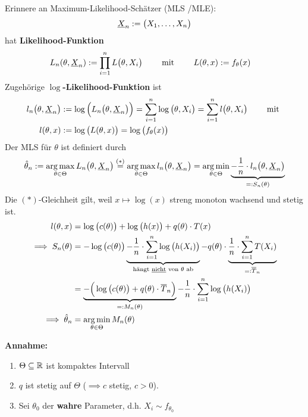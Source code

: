 Erinnere an Maximum-Likelihood-Schätzer (MLS /MLE):
\begin{align*}
	\underline{X}_n:=\big(X_1,\ldots,X_n\big)
\end{align*}
hat \textbf{Likelihood-Funktion}
\begin{align*}
	L_n(\theta,\underline{X}_n)&:=\prod\limits_{i=1}^n L\big(\theta,X_i\big)
	\qquad\text{ mit }\qquad
	L(\theta,x):=f_\theta(x)
\end{align*}
Zugehörige \textbf{$\log$-Likelihood-Funktion} ist
\begin{align*}
	l_n\big(\theta,\underline{X}_n\big)&:=\log\Big(L_n\big(\theta,\underline{X}_n\big)\Big)
	=\sum\limits_{i=1}^n\log\big(\theta,X_i\big)
	=\sum\limits_{i=1}^n l\big(\theta,X_i\big)\qquad\text{ mit }
\\
l(\theta,x)&:=\log\big(L(\theta,x)\big)=\log\big(f_\theta(x)\big)
\end{align*}
Der MLS für $\theta$ ist definiert durch
\begin{align*}
	\hat{\theta}_n
	:=\operatorname*{arg\,max}\limits_{\theta\in\Theta}L_n\big(\theta,\underline{X}_n\big)
	\overset{(\ast)}{=}
	\operatorname*{arg\,max}\limits_{\theta\in\Theta} l_n\big(\theta,\underline{X}_n\big)
	=\operatorname*{arg\,min}\limits_{\theta\in\Theta}\underbrace{-\frac{1}{n}\cdot  l_n\big(\theta,\underline{X}_n\big)}_{=:S_n(\theta)}
\end{align*}
Die $(\ast)$-Gleichheit gilt, weil $x\mapsto\log(x)$ streng monoton wachsend und stetig ist.
\begin{align*}
	l(\theta,x)&=\log\big(c(\theta)\big)+\log\big(h(x)\big)+q(\theta)\cdot T(x)\\
	\implies S_n(\theta)&=-\log\big(c(\theta)\big)\underbrace{-\frac{1}{n}\cdot\sum\limits_{i=1}^n\log\big(h(X_i)\big)}_{\text{hängt \underline{nicht} von $\theta$ ab}}-q(\theta)\cdot\underbrace{\frac{1}{n}\cdot\sum\limits_{i=1}^n T(X_i)}_{=:\overline{T}_n}\\
	&=\underbrace{-\Big(\log\big(c(\theta)\big)+q(\theta)\cdot\overline{T}_n\Big)}_{=:M_n(\theta)}-\frac{1}{n}\cdot\sum\limits_{i=1}^n\log\big(h(X_i)\big)\\
	\implies\hat{\theta}_n
	&=\operatorname*{arg\,min}\limits_{\theta\in\Theta} M_n(\theta)
\end{align*}


\textbf{Annahme:}
\begin{enumerate}[label=(\arabic*)]
	\item $\Theta\subseteq\mathbb{R}$ ist kompaktes Intervall
	\item $q$ ist stetig auf $\Theta$ ($\implies c$ stetig, $c>0$).
	\item Sei $\theta_0$ der \textbf{wahre} Parameter, d.h. $X_i\sim f_{\theta_0}$
\end{enumerate}

